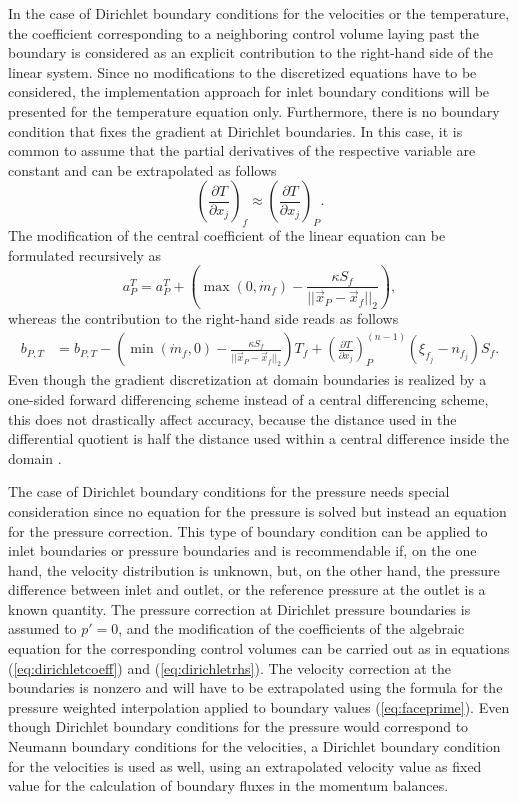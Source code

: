 In the case of Dirichlet boundary conditions for the velocities or the temperature, the coefficient corresponding to a neighboring control volume laying past the boundary is considered as an explicit contribution to the right-hand side of the linear system. Since no modifications to the discretized equations have to be considered, the implementation approach for inlet boundary conditions will be presented for the temperature equation only. Furthermore, there is no boundary condition that fixes the gradient at Dirichlet boundaries. In this case, it is common to assume that the partial derivatives of the respective variable are constant and can be extrapolated as follows
\begin{displaymath}
  \left( \frac{\partial T}{\partial x_j} \right)_f \approx \left( \frac{\partial T}{\partial x_j} \right)_P.
\end{displaymath}
The modification of the central coefficient of the linear equation can be formulated recursively as
\begin{equation}
  \label{eq:dirichletcoeff}
  a_P^{T} = a_P^{T} + \left( \max(0,\dot{m}_f )  - \frac{\kappa S_f}{|| \vec{x}_P - \vec{x}_f ||_2} \right),
\end{equation}
whereas the contribution to the right-hand side reads as follows
\begin{align}
  \label{eq:dirichletrhs}
  b_{P,T} &= b_{P,T} - \left( \min(\dot{m}_f,0) - \frac{\kappa S_f}{||\vec{x}_P - \vec{x}_f||_2}\right) T_f +
  \left( \frac{\partial T}{\partial x_j}\right)_P^{(n-1)} \left(\xi_{f_j} - n_{f_j}\right)S_f.
\end{align}
Even though the gradient discretization at domain boundaries is realized by a one-sided forward differencing scheme instead of a central differencing scheme, this does not drastically affect accuracy, because the distance used in the differential quotient is half the distance used within a central difference inside the domain \cite{schaefer99}.

The case of Dirichlet boundary conditions for the pressure needs special consideration since no equation for the pressure is solved but instead an equation for the pressure correction. This type of boundary condition can be applied to inlet boundaries or pressure boundaries and is recommendable if, on the one hand, the velocity distribution is unknown, but, on the other hand, the pressure difference between inlet and outlet, or the reference pressure at the outlet is a known quantity. The pressure correction at Dirichlet pressure boundaries is assumed to \(p' = 0\), and the modification of the coefficients of the algebraic equation for the corresponding control volumes can be carried out as in equations (\ref{eq:dirichletcoeff}) and (\ref{eq:dirichletrhs}). The velocity correction at the boundaries is nonzero and will have to be extrapolated using the formula for the pressure weighted interpolation applied to boundary values (\ref{eq:faceprime}). Even though Dirichlet boundary conditions for the pressure would correspond to Neumann boundary conditions for the velocities, a Dirichlet boundary condition for the velocities is used as well, using an extrapolated velocity value as fixed value for the calculation of boundary fluxes in the momentum balances. 

